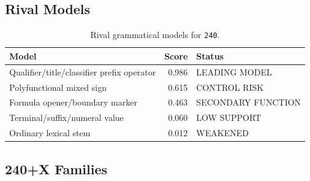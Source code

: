 \subsection{Rival Models}

\begin{table}[htbp]
\centering
\footnotesize
\begin{tabular}{p{}rp{}}
\toprule
\textbf{Model} & \textbf{Score} & \textbf{Status} \\
\midrule
Qualifier/title/classifier prefix operator & 0.986 & LEADING MODEL \\
Polyfunctional mixed sign & 0.615 & CONTROL RISK \\
Formula opener/boundary marker & 0.463 & SECONDARY FUNCTION \\
Terminal/suffix/numeral value & 0.060 & LOW SUPPORT \\
Ordinary lexical stem & 0.012 & WEAKENED \\
\bottomrule
\end{tabular}
\caption{Rival grammatical models for \texttt{240}.}
\label{tab:grammar-keystone-240-models}
\end{table}

\subsection{240+X Families}

